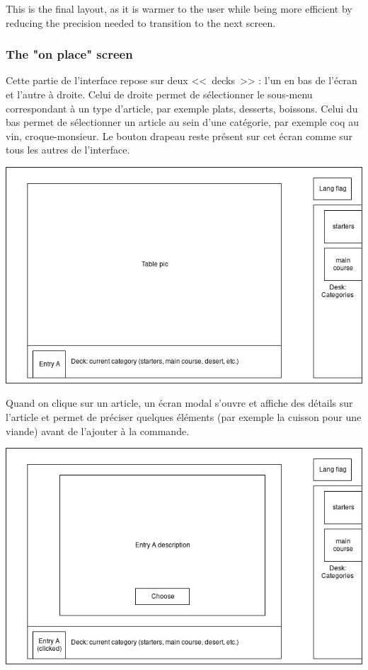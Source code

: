 \documentclass[a4paper,12pt]{article}
\begin{document}
This is the final layout, as it is warmer to the user while being more efficient by reducing the precision needed to
transition to the next screen.

\subsubsection{The "on place" screen}

Cette partie de l'interface repose sur deux <<~decks~>> : l'un en bas de l'écran et l'autre à droite. Celui de droite
permet de sélectionner le sous-menu correspondant à un type d'article, par exemple plats, desserts, boissons. Celui
du bas permet de sélectionner un article au sein d'une catégorie, par exemple coq au vin, croque-monsieur. Le bouton
drapeau reste présent sur cet écran comme sur tous les autres de l'interface.

\begin{center}
	\includegraphics[width=\textwidth]{in_place_screen1.jpg}
\end{center}

Quand on clique sur un article, un écran modal s'ouvre et affiche des détails sur l'article et permet de préciser
quelques éléments (par exemple la cuisson pour une viande) avant de l'ajouter à la commande.

\begin{center}
	\includegraphics[width=\textwidth]{in_place_screen2.jpg}
\end{center}
\end{document}
